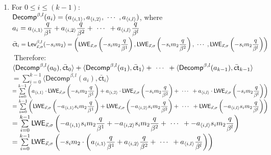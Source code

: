 \begin{myproof}
\begin{enumerate}
\item For $0 \leq i \leq (k - 1)$: \\
$\textsf{Decomp}^{\beta, l}(a_i) = (a_{\langle i, 1 \rangle}, a_{\langle i, 2 \rangle}, \text{ } \text{$\cdots$} \text{ }, a_{\langle i, l \rangle})$, where $a_i = a_{\langle i, 1 \rangle}\dfrac{q}{\beta^1} + a_{\langle i, 2 \rangle}\dfrac{q}{\beta^2} + \text{ } \text{$\cdots$} \text{ } + a_{\langle i, l \rangle}\dfrac{q}{\beta^l}$ \\
$\bar{\textsf{ct}}_i =  \textsf{Lev}_{\vec{s}, \sigma}^{\beta, l}(-s_im_2) = \left(\textsf{LWE}_{\vec{s}, \sigma}\left(-s_im_2\dfrac{q}{\beta^1}\right), \textsf{LWE}_{\vec{s}, \sigma}\left(-s_im_2\dfrac{q}{\beta^2}\right), \text{ } \text{$\cdots$} \text{ }, \textsf{LWE}_{\vec{s}, \sigma}\left(-s_im_2\dfrac{q}{\beta^l}\right) \right)$ \\

$ $
Therefore: \\
$\langle \textsf{Decomp}^{\beta, l}(a_0), \bar{\textsf{ct}}_0 \rangle + \langle \textsf{Decomp}^{\beta, l}(a_1), \bar{\textsf{ct}}_1 \rangle + \text{ } \text{$\cdots$} \text{ } + \langle \textsf{Decomp}^{\beta, l}(a_{k-1}), \bar{\textsf{ct}}_{k-1} \rangle$ \\
$= \sum\limits_{i=0}^{k-1}\langle \textsf{Decomp}^{\beta, l}(a_i), \bar{\textsf{ct}}_i \rangle$ \\
$= \sum\limits_{i=0}^{k-1}\left(a_{\langle i, 1\rangle} \cdot \textsf{LWE}_{\vec{s}, \sigma}\left(-s_im_2\dfrac{q}{\beta^1}\right) + a_{\langle i, 2\rangle} \cdot \textsf{LWE}_{\vec{s}, \sigma}\left(-s_im_2\dfrac{q}{\beta^2}\right) + \text{ } \text{$\cdots$} \text{ } + a_{\langle i, l\rangle} \cdot \textsf{LWE}_{\vec{s}, \sigma}\left(-s_im_2\dfrac{q}{\beta^l}\right)\right)$ \\
$= \sum\limits_{i=0}^{k-1}\left(\textsf{LWE}_{\vec{s}, \sigma}\left(-a_{\langle i, 1\rangle}s_im_2\dfrac{q}{\beta^1}\right) + \textsf{LWE}_{\vec{s}, \sigma}\left(-a_{\langle i, 2\rangle}s_im_2\dfrac{q}{\beta^2}\right) + \text{ } \text{$\cdots$} \text{ } + \textsf{LWE}_{\vec{s}, \sigma}\left(-a_{\langle i, l\rangle}s_im_2\dfrac{q}{\beta^l}\right)\right)$ \\
$= \sum\limits_{i=0}^{k-1}\textsf{LWE}_{\vec{s}, \sigma}\left(-a_{\langle i, 1\rangle}s_im_2\dfrac{q}{\beta^1} + -a_{\langle i, 2\rangle}s_im_2\dfrac{q}{\beta^2} + \text{ } \text{$\cdots$} \text{ } + -a_{\langle i, l\rangle}s_im_2\dfrac{q}{\beta^l}\right)$ \\
$= \sum\limits_{i=0}^{k-1}\textsf{LWE}_{\vec{s}, \sigma}\left(-s_im_2 \cdot \left(a_{\langle i, 1\rangle}\dfrac{q}{\beta^1} + a_{\langle i, 2\rangle}\dfrac{q}{\beta^2} + \text{ } \text{$\cdots$} \text{ } + a_{\langle i, l\rangle}\dfrac{q}{\beta^l}\right)\right)$ \\

\end{enumerate}
\end{myproof}
